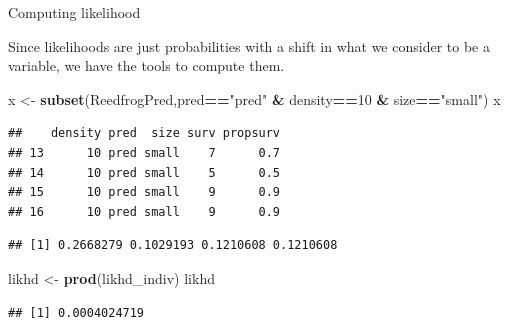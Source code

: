 \documentclass[
  ignorenonframetext,
]{beamer}
\newenvironment{Shaded}{\begin{snugshade}}{\end{snugshade}}
\newcommand{\DataTypeTok}[1]{\textcolor[rgb]{0.13,0.29,0.53}{#1}}
\newcommand{\DecValTok}[1]{\textcolor[rgb]{0.00,0.00,0.81}{#1}}
\newcommand{\FloatTok}[1]{\textcolor[rgb]{0.00,0.00,0.81}{#1}}
\newcommand{\KeywordTok}[1]{\textcolor[rgb]{0.13,0.29,0.53}{\textbf{#1}}}
\newcommand{\NormalTok}[1]{#1}
\newcommand{\OperatorTok}[1]{\textcolor[rgb]{0.81,0.36,0.00}{\textbf{#1}}}
\newcommand{\StringTok}[1]{\textcolor[rgb]{0.31,0.60,0.02}{#1}}
\begin{document}
\begin{frame}[fragile]{Computing likelihood}
\protect\hypertarget{computing-likelihood}{}

Since likelihoods are just probabilities with a shift in what we
consider to be a variable, we have the tools to compute them.

\scriptsize

\begin{Shaded}
\begin{Highlighting}[]
\NormalTok{x <-}\StringTok{ }\KeywordTok{subset}\NormalTok{(ReedfrogPred,pred}\OperatorTok{==}\StringTok{"pred"} \OperatorTok{&}\StringTok{ }\NormalTok{density}\OperatorTok{==}\DecValTok{10} \OperatorTok{&}\StringTok{ }\NormalTok{size}\OperatorTok{==}\StringTok{"small"}\NormalTok{)}
\NormalTok{x}
\end{Highlighting}
\end{Shaded}

\begin{verbatim}
##    density pred  size surv propsurv
## 13      10 pred small    7      0.7
## 14      10 pred small    5      0.5
## 15      10 pred small    9      0.9
## 16      10 pred small    9      0.9
\end{verbatim}

\begin{Shaded}
\end{Shaded}

\begin{verbatim}
## [1] 0.2668279 0.1029193 0.1210608 0.1210608
\end{verbatim}

\begin{Shaded}
\begin{Highlighting}[]
\NormalTok{likhd <-}\StringTok{ }\KeywordTok{prod}\NormalTok{(likhd_indiv)}
\NormalTok{likhd}
\end{Highlighting}
\end{Shaded}

\begin{verbatim}
## [1] 0.0004024719
\end{verbatim}

\end{frame}
\end{document}
